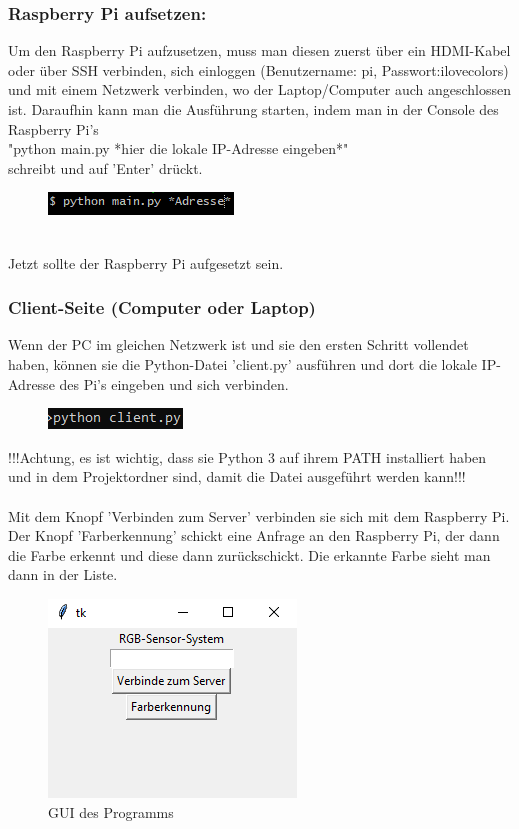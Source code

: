 \documentclass[12pt, a4paper]{article}
\begin{document}
	\subsubsection{Raspberry Pi aufsetzen:}
	Um den Raspberry Pi aufzusetzen, muss man diesen zuerst über ein HDMI-Kabel oder über SSH verbinden, sich 			einloggen (Benutzername: pi, Passwort:ilovecolors) und 
	mit einem Netzwerk verbinden, wo der Laptop/Computer auch angeschlossen ist. Daraufhin kann man die Ausführung 		starten, indem man in der Console des Raspberry Pi's \\ "python main.py *hier die lokale IP-Adresse eingeben*" 		\\ schreibt und auf 'Enter' drückt.
	\begin{figure}[h]
		\includegraphics{beispiel.png}
	\end{figure}
	\\
	Jetzt sollte der Raspberry Pi aufgesetzt sein.
	\\
	\subsubsection{Client-Seite (Computer oder Laptop)}
	Wenn der PC im gleichen Netzwerk ist und sie den ersten Schritt vollendet haben, können sie die Python-Datei 		'client.py' ausführen und dort die lokale IP-Adresse des Pi's eingeben und sich verbinden.
	
	\begin{figure}[h]
		\includegraphics{beispiel2.png}
	\end{figure}
	\noindent	
	!!!Achtung, es ist wichtig, dass sie Python 3 auf ihrem PATH installiert haben und in dem Projektordner sind, 
	damit die Datei ausgeführt werden kann!!! 
	\\
	\\
	Mit dem Knopf 'Verbinden zum Server' verbinden sie sich mit dem Raspberry Pi. Der Knopf 'Farberkennung' schickt eine Anfrage an den Raspberry Pi, der dann die Farbe erkennt und diese dann zurückschickt. Die erkannte 
	Farbe sieht man dann in der Liste.
	
	\begin{figure}[h]
		\centering
		\includegraphics[frame]{clientBeispiel.png}
		\caption{GUI des Programms}
	\end{figure}
	\newpage
	
\end{document}
